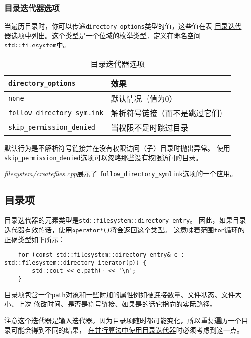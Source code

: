 \subsubsection{目录迭代器选项}
当遍历目录时，你可以传递\texttt{directory\_options}类型的值，这些值在表
\hyperref[t20.21]{目录迭代器选项}中列出。这个类型是一个位域的枚举类型，定义在命名空间
\texttt{std::filesystem}中。
\begin{table}[ht]
    \centering
    \begin{tabular}{l|l}
        \hline
        \texttt{directory\_options}         & \textbf{效果}     \\
        \hline
        \texttt{none}                       & 默认情况（值为0）       \\
        \texttt{follow\_directory\_symlink} & 解析符号链接（而不是跳过它们） \\
        \texttt{skip\_permission\_denied}   & 当权限不足时跳过目录      \\
        \hline
    \end{tabular}
    \caption{目录迭代器选项}
    \label{t20.21}
\end{table}

默认行为是不解析符号链接并在没有权限访问（子）目录时抛出异常。
使用\texttt{skip\_permission\_denied}选项可以忽略那些没有权限访问的目录。

\hyperref[ch20.1.3]{\emph{filesystem/createfiles.cpp}}展示了
\texttt{follow\_directory\_symlink}选项的一个应用。

\subsection{目录项}
目录迭代器的元素类型是\texttt{std::filesystem::directory\_entry}。
因此，如果目录迭代器有效的话，使用\texttt{operator*()}将会返回这个类型。
这意味着范围\texttt{for}循环的正确类型如下所示：
\begin{lstlisting}
    for (const std::filesystem::directory_entry& e : std::filesystem::directory_iterator(p)) {
        std::cout << e.path() << '\n';
    }
\end{lstlisting}
目录项包含一个\texttt{path}对象和一些附加的属性例如硬连接数量、文件状态、文件大小、上次
修改时间、是否是符号链接、如果是的话它指向的实际路径。

注意这个迭代器是输入迭代器。因为目录项随时都可能变化，所以重复遍历一个目录可能会得到不同的结果，
\hyperref[ch22.6.1.4]{在并行算法中使用目录迭代器}时必须考虑到这一点。

